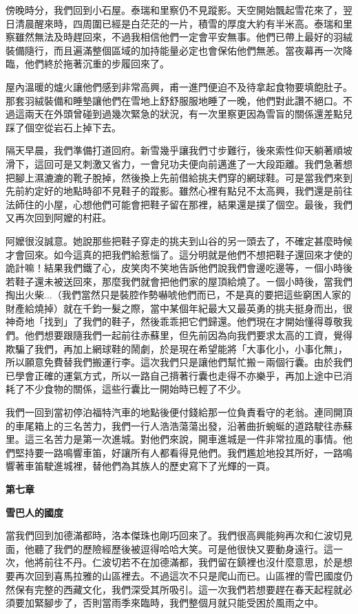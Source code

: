 傍晚時分，我們回到小石屋。泰瑞和里察仍不見蹤影。天空開始飄起雪花來了，翌日清晨醒來時，四周圍已經是白茫茫的一片，積雪的厚度大約有半米高。泰瑞和里察雖然無法及時趕回來，不過我相信他們一定會平安無事。他們已帶上最好的羽絨裝備隨行，而且遍滿整個區域的加持能量必定也會保佑他們無恙。當夜幕再一次降臨，他們終於拖著沉重的步履回來了。

屋內溫暖的爐火讓他們感到非常高興，甫一進門便迫不及待拿起食物要填飽肚子。那套羽絨裝備和睡墊讓他們在雪地上舒舒服服地睡了一晚，他們對此讚不絕口。不過這兩天在外頭曾碰到過幾次緊急的狀況，有一次里察更因為雪盲的關係還差點兒踩了個空從岩石上掉下去。

隔天早晨，我們準備打道回府。新雪幾乎讓我們寸步難行，後來索性仰天躺著順坡滑下，這回可是又刺激又省力，一會兒功夫便向前邁進了一大段距離。我們急著想把腳上濕漉漉的靴子脫掉，然後換上先前借給挑夫們穿的網球鞋。可是當我們來到先前約定好的地點時卻不見鞋子的蹤影。雖然心裡有點兒不太高興，我們還是前往法師住的小屋，心想他們可能會把鞋子留在那裡，結果還是撲了個空。最後，我們又再次回到阿嬤的村莊。

阿嬤很沒誠意。她說那些把鞋子穿走的挑夫到山谷的另一頭去了，不確定甚麼時候才會回來。如今這真的把我們給惹惱了。這分明就是他們不想把鞋子還回來才使的詭計嘛！結果我們鐵了心，皮笑肉不笑地告訴他們說我們會邊吃邊等，ㄧ個小時後若鞋子還未被送回來，那麼我們就會把他們家的屋頂給燒了。ㄧ個小時後，當我們掏出火柴...（我們當然只是裝腔作勢嚇唬他們而已，不是真的要把這些窮困人家的財產給燒掉）就在千鈞一髮之際，當中某個年紀最大又最英勇的挑夫挺身而出，很神奇地「找到」了我們的鞋子，然後乖乖把它們歸還。他們現在才開始懂得尊敬我們。他們想要跟隨我們一起前往赤蘇里，但先前因為向我們要求太高的工資，覺得欺騙了我們，再加上網球鞋的鬧劇，於是現在希望能將「大事化小，小事化無」，所以願意免費替我們搬運行李。這次我們只是讓他們幫忙搬ㄧ兩個行囊。由於我們已學會正確的運氣方式，所以一路自己揹著行囊也走得不亦樂乎，再加上途中已消耗了不少食物的關係，這些行囊比一開始時已輕了不少。

我們一回到當初停泊福特汽車的地點後便付錢給那一位負責看守的老翁。連同開頂的車尾箱上的三名苦力，我們一行人浩浩蕩蕩出發，沿著曲折蜿蜒的道路駛往赤蘇里。這三名苦力是第一次進城。對他們來說，開車進城是一件非常拉風的事情。他們堅持要一路鳴響車笛，好讓所有人都看得見他們。我們尷尬地投其所好，一路鳴響著車笛駛進城裡，替他們為其族人的歷史寫下了光輝的一頁。

\textbf{第七章}

\textbf{雪巴人的國度}

當我們回到加德滿都時，洛本傑珠也剛巧回來了。我們很高興能夠再次和仁波切見面，他聽了我們的歷險經歷後被逗得哈哈大笑。可是他很快又要動身遠行。這一次，他將前往不丹。仁波切若不在加德滿都，我們留在鎮裡也沒什麼意思，於是想要再次回到喜馬拉雅的山區裡去。不過這次不只是爬山而已。山區裡的雪巴國度仍然保有完整的西藏文化，我們深受其所吸引。這一次我們若想要趕在春天起程就必須要加緊腳步了，否則當雨季來臨時，我們整個月就只能受困於風雨之中。

